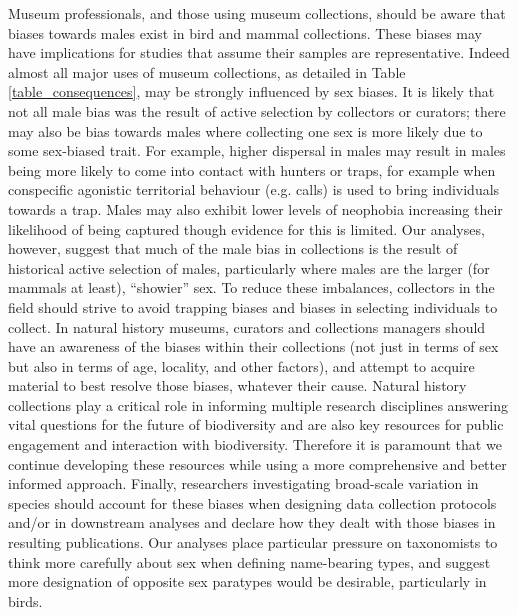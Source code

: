 \documentclass[a4paper, 12pt]{article}
\begin{document}
Museum professionals, and those using museum collections, should be aware that biases towards males exist in bird and mammal collections. 
These biases may have implications for studies that assume their samples are representative. Indeed almost all major uses of museum collections, as detailed in Table \ref{table_consequences}, may be strongly influenced by sex biases. 
It is likely that not all male bias was the result of active selection by collectors or curators; there may also be bias towards males where collecting one sex is more likely due to some sex-biased trait. 
For example, higher dispersal in males may result in males being more likely to come into contact with hunters or traps, for example when conspecific agonistic territorial behaviour (e.g. calls) is used to bring individuals towards a trap. 
Males may also exhibit lower levels of neophobia increasing their likelihood of being captured though evidence for this is limited\cite{crane2017patterns,laviola1992sexual}. 
Our analyses, however, suggest that much of the male bias in collections is the result of historical active selection of males, particularly where males are the larger (for mammals at least), ``showier'' sex. 
To reduce these imbalances, collectors in the field should strive to avoid trapping biases and biases in selecting individuals to collect. 
In natural history museums, curators and collections managers should have an awareness of the biases within their collections (not just in terms of sex but also in terms of age, locality, and other factors), and attempt to acquire material to best resolve those biases, whatever their cause. 
Natural history collections play a critical role in informing multiple research disciplines answering vital questions for the future of biodiversity\cite{meineke2018biological} and are also key resources for public engagement and interaction with biodiversity\cite{machin2008}. 
Therefore it is paramount that we continue developing these resources while using a more comprehensive and better informed approach. 
Finally, researchers investigating broad-scale variation in species should account for these biases when designing data collection protocols and/or in downstream analyses and declare how they dealt with those biases in resulting publications. 
Our analyses place particular pressure on taxonomists to think more carefully about sex when defining name-bearing types, and suggest more designation of opposite sex paratypes would be desirable, particularly in birds. 



\end{document}
